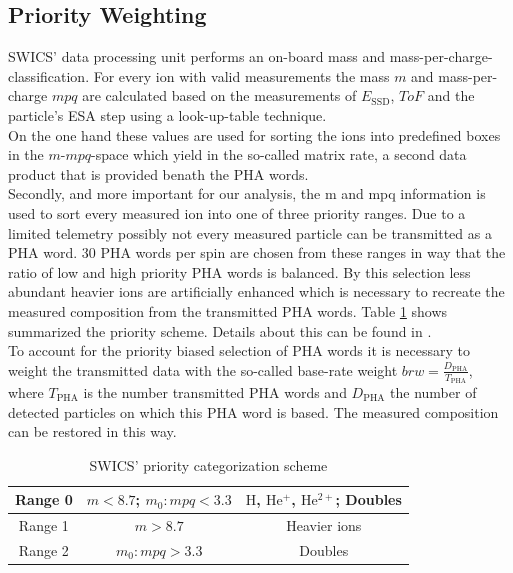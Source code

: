 \subsection{Priority Weighting}
\label{subsec:prio}
SWICS' data processing unit performs an on-board mass and mass-per\--charge-clas\-sification. For every ion with valid measurements the mass $m$ and mass-per-charge $mpq$ are calculated based on the measurements of $E_{\mathrm{SSD}}$, $ToF$ and the particle's ESA step using a look-up-table technique.\\
On the one hand these values are used for sorting the ions into predefined boxes in the $m$-$mpq$-space which yield in the so-called matrix rate, a second data product that is provided benath the PHA words.\\
Secondly, and more important for our analysis, the m and mpq information is used to sort every measured ion into one of three priority ranges. Due to a limited telemetry possibly not every measured particle can be transmitted as a PHA word. 
30 PHA words per spin are chosen from these ranges in way that the ratio of low and high priority PHA words is balanced. By this selection less abundant heavier ions are artificially enhanced which is necessary to recreate the measured composition from the transmitted PHA words. Table \ref{tab} shows summarized the priority scheme. Details about this can be found in \citet{gloeckler_1992}.\\
To account for the priority biased selection of PHA words it is necessary to weight the transmitted data with the so-called base-rate weight $brw = \frac{D_{\mathrm{PHA}}}{T_{\mathrm{PHA}}}$, where $T_{\mathrm{PHA}}$ is the number transmitted PHA words and $D_{\mathrm{PHA}}$ the number of detected particles on which this PHA word is based. The measured composition can be restored in this way.
\begin{table}[h]
	\caption{SWICS' priority categorization scheme} 
	\centering
	\begin{tabular}{c|c|c}
		Range 0 & $m < 8.7$;  $m_0 : mpq < 3.3$ & $\mathrm{H}$, $\mathrm{He^+}$, $\mathrm{He^{2+}}$; Doubles\\ 
		\hline 
		Range 1 & $m > 8.7$ & Heavier ions \\ 
		\hline 
		Range 2 & $m_0 : mpq > 3.3$ & Doubles \\ 
	\end{tabular} 
	\label{tab}
\end{table}
%
%
%
